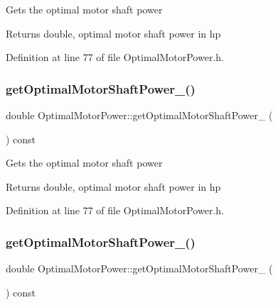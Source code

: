 Gets the optimal motor shaft power

\begin{DoxyReturn}{Returns}
double, optimal motor shaft power in hp 
\end{DoxyReturn}


Definition at line 77 of file Optimal\+Motor\+Power.\+h.

\mbox{\label{class_optimal_motor_power_af902365015880d5f11d865465672d7bb}} 
\subsubsection{\texorpdfstring{get\+Optimal\+Motor\+Shaft\+Power\+\_\+()}{getOptimalMotorShaftPower\_()}\hspace{0.1cm}{\footnotesize\ttfamily [2/3]}}
{\footnotesize\ttfamily double Optimal\+Motor\+Power\+::get\+Optimal\+Motor\+Shaft\+Power\+\_\+ (\begin{DoxyParamCaption}{ }\end{DoxyParamCaption}) const\hspace{0.3cm}{\ttfamily [inline]}}

Gets the optimal motor shaft power

\begin{DoxyReturn}{Returns}
double, optimal motor shaft power in hp 
\end{DoxyReturn}


Definition at line 77 of file Optimal\+Motor\+Power.\+h.

\mbox{\label{class_optimal_motor_power_af902365015880d5f11d865465672d7bb}} 
\subsubsection{\texorpdfstring{get\+Optimal\+Motor\+Shaft\+Power\+\_\+()}{getOptimalMotorShaftPower\_()}\hspace{0.1cm}{\footnotesize\ttfamily [3/3]}}
{\footnotesize\ttfamily double Optimal\+Motor\+Power\+::get\+Optimal\+Motor\+Shaft\+Power\+\_\+ (\begin{DoxyParamCaption}{ }\end{DoxyParamCaption}) const\hspace{0.3cm}{\ttfamily [inline]}}

